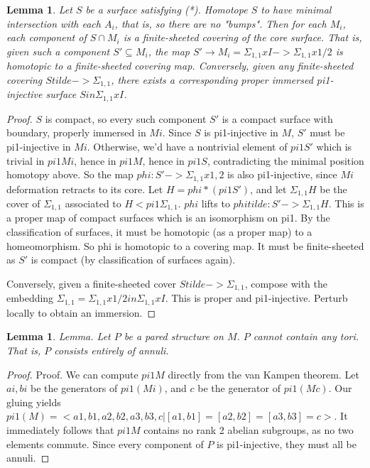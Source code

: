 \documentclass[12pt]{amsart}
\newtheorem{lemma}[theorem]{Lemma}
\theoremstyle{definition}
\newcommand{\Si}{\Sigma}
\newcommand{\cin}{\subseteq}
\begin{document}
\begin{lemma}

Let $S$ be a surface satisfying (*). Homotope
$S$ to have minimal intersection with each $A_i$, that is, so there are no "bumps".
Then for each $M_i$, each component of $S \cap M_i$ is a finite-sheeted covering
of the core surface. That is, given such a component $S' \cin M_i$, the map $S'
\to M_i = \Si_{1,1}xI -> \Si_{1,1}x{1/2}$ is homotopic to a finite-sheeted covering
map. Conversely, given any finite-sheeted covering $Stilde -> \Si_{1,1}$, there
exists a corresponding proper immersed pi1-injective surface $S in \Si_{1,1}xI$.

\end{lemma}
\begin{proof}

$S$ is compact, so every such component $S'$ is a compact surface with
boundary, properly immersed in $Mi$. Since $S$ is pi1-injective in $M$, $S'$ must be
pi1-injective in $Mi$. Otherwise, we'd have a nontrivial element of $pi1S'$ which
is trivial in $pi1Mi$, hence in $pi1M$, hence in $pi1S$, contradicting the minimal
position homotopy above. So the map $phi : S'->\Si_{1,1}x{1,2}$ is also pi1-injective,
since $Mi$ deformation retracts to its core. Let $H = phi*(pi1S')$, and let
$\Si_{1,1}H$
be the cover of $\Si_{1,1}$ associated to $H<pi1\Si_{1,1}$. $phi$ lifts to
$phitilde : S' ->
\Si_{1,1}H$. This is a proper map of compact surfaces which is an isomorphism on pi1.
By the classification of surfaces, it must be homotopic (as a proper map) to
a homeomorphism. So phi is homotopic to a covering map. It must be
finite-sheeted as $S'$ is compact (by classification of surfaces again).

Conversely, given a finite-sheeted cover $Stilde -> \Si_{1,1}$, compose with the
embedding $\Si_{1,1} = \Si_{1,1}x{1/2} in \Si_{1,1}xI$. This is proper and pi1-injective.
Perturb locally to obtain an immersion.

\end{proof}

\begin{lemma}

Lemma. Let $P$ be a pared structure on $M$. $P$ cannot contain any tori. That is,
$P$ consists entirely of annuli.

\end{lemma}
\begin{proof}

Proof. We can compute $pi1M$ directly from the van Kampen theorem. Let $ai,bi$ be
the generators of $pi1(Mi)$, and $c$ be the generator of $pi1(Mc)$. Our gluing yields
$pi1(M) = <a1,b1,a2,b2,a3,b3,c| [a1,b1]=[a2,b2]=[a3,b3]=c>$. It immediately
follows that $pi1M$ contains no rank 2 abelian subgroups, as no two elements
commute. Since every component of $P$ is pi1-injective, they must all be annuli.

\end{proof}
\end{document}
